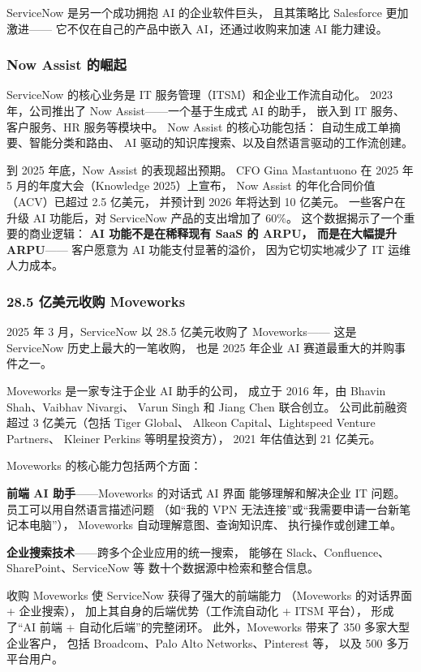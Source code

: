 ServiceNow 是另一个成功拥抱 AI 的企业软件巨头，
且其策略比 Salesforce 更加激进——
它不仅在自己的产品中嵌入 AI，还通过收购来加速 AI 能力建设。

\subsubsection{Now Assist 的崛起}
ServiceNow 的核心业务是 IT 服务管理（ITSM）和企业工作流自动化。
2023 年，公司推出了 Now Assist——一个基于生成式 AI 的助手，
嵌入到 IT 服务、客户服务、HR 服务等模块中。
Now Assist 的核心功能包括：
自动生成工单摘要、智能分类和路由、
AI 驱动的知识库搜索、以及自然语言驱动的工作流创建。

到 2025 年底，Now Assist 的表现超出预期。
CFO Gina Mastantuono 在 2025 年 5 月的年度大会（Knowledge 2025）上宣布，
Now Assist 的年化合同价值（ACV）已超过 2.5 亿美元，
并预计到 2026 年将达到 10 亿美元。
一些客户在升级 AI 功能后，对 ServiceNow 产品的支出增加了 60\%。
这个数据揭示了一个重要的商业逻辑：
\textbf{AI 功能不是在稀释现有 SaaS 的 ARPU，
而是在大幅提升 ARPU}——
客户愿意为 AI 功能支付显著的溢价，
因为它切实地减少了 IT 运维人力成本。

\subsubsection{28.5 亿美元收购 Moveworks}
2025 年 3 月，ServiceNow 以 28.5 亿美元收购了 Moveworks——
这是 ServiceNow 历史上最大的一笔收购，
也是 2025 年企业 AI 赛道最重大的并购事件之一。

Moveworks 是一家专注于企业 AI 助手的公司，
成立于 2016 年，由 Bhavin Shah、Vaibhav Nivargi、
Varun Singh 和 Jiang Chen 联合创立。
公司此前融资超过 3 亿美元（包括 Tiger Global、
Alkeon Capital、Lightspeed Venture Partners、
Kleiner Perkins 等明星投资方），
2021 年估值达到 21 亿美元。

Moveworks 的核心能力包括两个方面：

\textbf{前端 AI 助手}——Moveworks 的对话式 AI 界面
能够理解和解决企业 IT 问题。
员工可以用自然语言描述问题
（如``我的 VPN 无法连接''或``我需要申请一台新笔记本电脑''），
Moveworks 自动理解意图、查询知识库、
执行操作或创建工单。

\textbf{企业搜索技术}——跨多个企业应用的统一搜索，
能够在 Slack、Confluence、SharePoint、ServiceNow 等
数十个数据源中检索和整合信息。

收购 Moveworks 使 ServiceNow 获得了强大的前端能力
（Moveworks 的对话界面 + 企业搜索），
加上其自身的后端优势（工作流自动化 + ITSM 平台），
形成了``AI 前端 + 自动化后端''的完整闭环。
此外，Moveworks 带来了 350 多家大型企业客户，
包括 Broadcom、Palo Alto Networks、Pinterest 等，
以及 500 多万平台用户。

